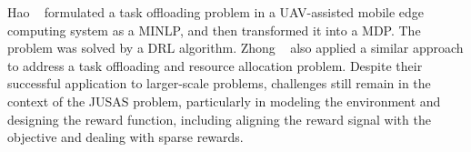\begin{revresponse}
\begin{changes}
		Hao \etal~\cite{hao-minlp} formulated a task offloading problem in a UAV-assisted mobile edge computing system as a MINLP, and then transformed it into a MDP.
		The problem was solved by a DRL algorithm.
		Zhong \etal~\cite{zhong-minlp} also applied a similar approach to address a task offloading and resource allocation problem.
		Despite their successful application to larger-scale problems, challenges still remain in the context of the JUSAS problem, particularly in modeling the environment and designing the reward function, including aligning the reward signal with the objective and dealing with sparse rewards.
	\end{changes}
\end{revresponse}

